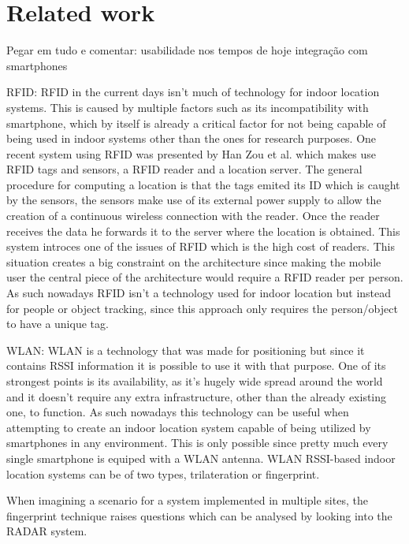 \section{Related work}
\label{sec:related}

Pegar em tudo e comentar:
	usabilidade nos tempos de hoje
	integração com smartphones


RFID:
	\acf{RFID} in the current days isn't much of technology for indoor location systems. This is caused by multiple factors such as its incompatibility with smartphone, which by itself is already a critical factor for not being capable of being used in indoor systems other than the ones for research purposes. One recent system using \ac{RFID} was presented by Han Zou et al. \cite{rfid_sys} which makes use RFID tags and sensors, a \ac{RFID} reader and a location server. The general procedure for computing a location is that the tags emited its ID which is caught by the sensors, the sensors make use of its external power supply to allow the creation of a continuous wireless connection with the reader. Once the reader receives the data he forwards it to the server where the location is obtained. This system introces one of the issues of RFID which is the high cost of readers. This situation creates a big constraint on the architecture since making the mobile user the central piece of the architecture would require a \ac{RFID} reader per person. As such nowadays \ac{RFID} isn't a technology used for indoor location but instead for people or object tracking, since this approach only requires the person/object to have a unique tag. 
	

WLAN:
	WLAN is a technology that was made for positioning but since it contains \acf{RSSI} information it is possible to use it with that purpose. One of its strongest points is its availability, as it's hugely wide spread around the world and it doesn't require any extra infrastructure, other than the already existing one, to function. As such nowadays this technology can be useful when attempting to create an indoor location system capable of being utilized by smartphones in any environment. This is only possible since pretty much every single smartphone is equiped with a WLAN antenna.
	WLAN \ac{RSSI}-based indoor location systems can be of two types, trilateration or fingerprint.

	When imagining a scenario for a system implemented in multiple sites, the fingerprint technique raises questions which can be analysed by looking into the RADAR system. 

